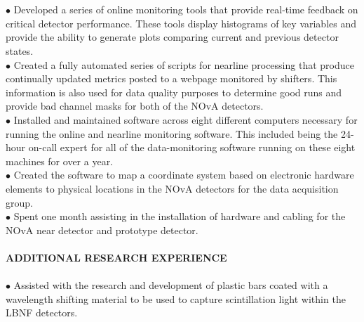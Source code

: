 \documentclass[10pt]{article} %
\begin{document}

%
\medskip \\
\\
$\bullet$ Developed a series of online monitoring tools that provide real-time feedback on critical detector performance. These tools display histograms of key variables and provide the ability to generate plots comparing current and previous detector states.
\\
%
$\bullet$ Created a fully automated series of scripts for nearline processing that produce continually updated metrics posted to a webpage monitored by shifters. This information is also used for data quality purposes to determine good runs and provide bad channel masks for both of the NOvA detectors.
\\
%
$\bullet$ Installed and maintained software across eight different computers necessary for running the online and nearline monitoring software. This included being the 24-hour on-call expert for all of the data-monitoring software running on these eight machines for over a year.
\\
%
$\bullet$ Created the software to map a coordinate system based on electronic hardware elements to physical locations in the NOvA detectors for the data acquisition group.
\\
%
$\bullet$ Spent one month assisting in the installation of hardware and cabling for the NOvA near detector and prototype detector.
\\
%
\medskip \\
{\bf ADDITIONAL RESEARCH EXPERIENCE~~\hrulefill}
\medskip \\
\\
%
$\bullet$ Assisted with the research and development of plastic bars coated with a wavelength shifting material to be used to capture scintillation light within the LBNF detectors.
\\
%
\end{document}
